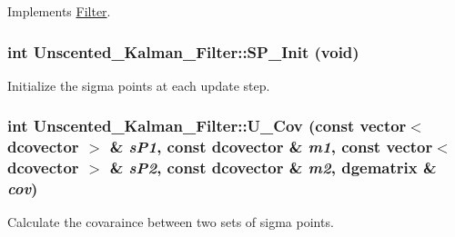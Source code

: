 Implements \hyperlink{class_filter_20ecd17fed3b8f11a76c960fe5e7144b}{Filter}.\hypertarget{class_unscented___kalman___filter_bbc48e2cfd73c0427cedea914e68ed1a}{
\subsubsection[{SP\_\-Init}]{\setlength{\rightskip}{0pt plus 5cm}int Unscented\_\-Kalman\_\-Filter::SP\_\-Init (void)}}
\label{class_unscented___kalman___filter_bbc48e2cfd73c0427cedea914e68ed1a}


Initialize the sigma points at each update step. 

\hypertarget{class_unscented___kalman___filter_1229b08a8f97c4a877baedd390d0c55d}{
\subsubsection[{U\_\-Cov}]{\setlength{\rightskip}{0pt plus 5cm}int Unscented\_\-Kalman\_\-Filter::U\_\-Cov (const vector$<$ dcovector $>$ \& {\em sP1}, \/  const dcovector \& {\em m1}, \/  const vector$<$ dcovector $>$ \& {\em sP2}, \/  const dcovector \& {\em m2}, \/  dgematrix \& {\em cov})}}
\label{class_unscented___kalman___filter_1229b08a8f97c4a877baedd390d0c55d}


Calculate the covaraince between two sets of sigma points. 

